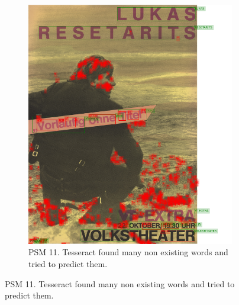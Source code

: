 \begin{figure}[hbtp!]
    \begin{subfigure}{0.45\textwidth}
        \includegraphics[scale=0.29]{obrazky/plakaty/result_tesseract_vienna2_nosplit_psm11-83.png}
        \caption{PSM 11. Tesseract found many non existing words and tried to predict them.}
        \label{Im4:ex:tess11}
    \end{subfigure}


\end{figure}
